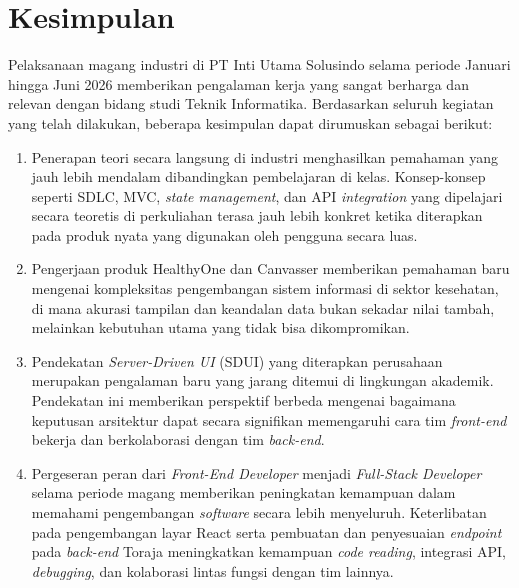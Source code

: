 \section{Kesimpulan}

Pelaksanaan magang industri di PT Inti Utama Solusindo selama periode Januari
hingga Juni 2026 memberikan pengalaman kerja yang sangat berharga dan relevan
dengan bidang studi Teknik Informatika. Berdasarkan seluruh kegiatan yang telah
dilakukan, beberapa kesimpulan dapat dirumuskan sebagai berikut:

\begin{enumerate}
      \item Penerapan teori secara langsung di industri menghasilkan pemahaman yang jauh
            lebih mendalam dibandingkan pembelajaran di kelas. Konsep-konsep seperti SDLC,
            MVC, \textit{state management}, dan API \textit{integration} yang dipelajari
            secara teoretis di perkuliahan terasa jauh lebih konkret ketika diterapkan pada
            produk nyata yang digunakan oleh pengguna secara luas.
      \item Pengerjaan produk HealthyOne dan Canvasser memberikan pemahaman baru mengenai
            kompleksitas pengembangan sistem informasi di sektor kesehatan, di mana akurasi
            tampilan dan keandalan data bukan sekadar nilai tambah, melainkan kebutuhan
            utama yang tidak bisa dikompromikan.
      \item Pendekatan \textit{Server-Driven UI} (SDUI) yang diterapkan perusahaan
            merupakan pengalaman baru yang jarang ditemui di lingkungan akademik.
            Pendekatan ini memberikan perspektif berbeda mengenai bagaimana keputusan
            arsitektur dapat secara signifikan memengaruhi cara tim \textit{front-end}
            bekerja dan berkolaborasi dengan tim \textit{back-end}.
      \item Pergeseran peran dari \textit{Front-End Developer} menjadi \textit{Full-Stack
                  Developer} selama periode magang memberikan peningkatan kemampuan dalam
            memahami pengembangan \textit{software} secara lebih menyeluruh. Keterlibatan
            pada pengembangan layar React serta pembuatan dan penyesuaian \textit{endpoint}
            pada \textit{back-end} Toraja meningkatkan kemampuan \textit{code reading},
            integrasi API, \textit{debugging}, dan kolaborasi lintas fungsi dengan tim
            lainnya.
\end{enumerate}

